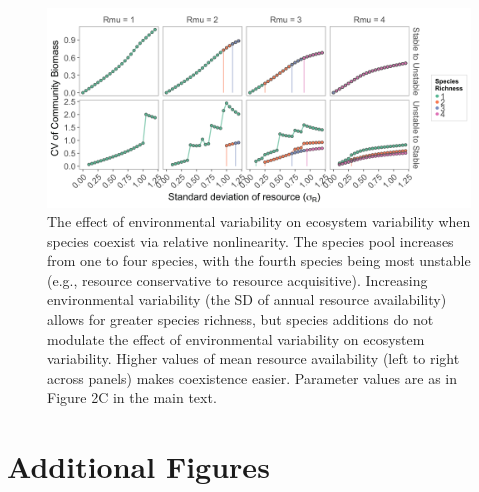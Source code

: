 \documentclass[11pt,]{article}
\begin{document}
\begin{figure}[!ht]
  \centering
      \includegraphics[width=7in]{./components/SI_relative_nonlinearity_four_rmus.png}
  \caption{The effect of environmental variability on ecosystem variability when species coexist via relative nonlinearity. The species pool increases from one to four species, with the fourth species being most unstable (e.g., resource conservative to resource acquisitive). Increasing environmental variability (the SD of annual resource availability) allows for greater species richness, but species additions do not modulate the effect of environmental variability on ecosystem variability. Higher values of mean resource availability (left to right across panels) makes coexistence easier. Parameter values are as in Figure 2C in the main text.}
\end{figure}

\newpage{}

\section{Additional Figures}
\end{document}
